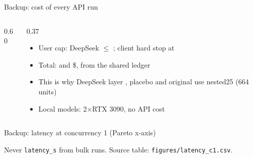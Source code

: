 \begin{frame}{Backup: cost of every API run}
  \begin{columns}[T]
    \begin{column}{0.60\textwidth}
      {\scriptsize\par}
    \end{column}
    \begin{column}{0.37\textwidth}
      \begin{itemize}\small
        \item User cap: DeepSeek $\le$ ; client hard stop at 
        \item Total: \textyen{} and \$, from the shared ledger
        \item This is why DeepSeek layer , placebo and original use nested25 (664 units)
        \item Local models: 2$\times$RTX 3090, no API cost
      \end{itemize}
    \end{column}
  \end{columns}
\end{frame}

\begin{frame}{Backup: latency at concurrency 1 (Pareto x-axis)}
  \centering
  {\tiny\renewcommand{\arraystretch}{0.92}\resizebox{\linewidth}{!}{}\par}
  \vfill
  {\scriptsize Never \texttt{latency\_s} from bulk runs. Source table: \texttt{figures/latency\_c1.csv}.\par}
\end{frame}

